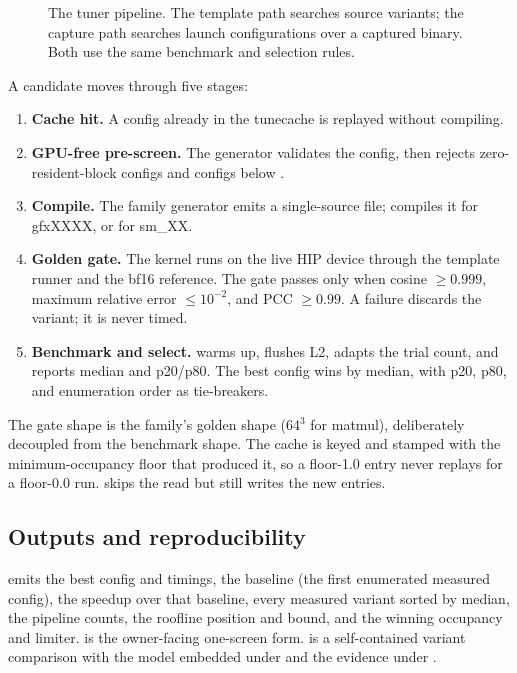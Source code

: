 \begin{figure}[htbp]
\centering
\resizebox{\textwidth}{!}{}
\caption{The tuner pipeline. The template path searches source variants;
the capture path searches launch configurations over a captured binary. Both
use the same benchmark and selection rules.}
\label{fig:tuner}
\end{figure}

A candidate moves through five stages:
\begin{enumerate}
  \item \textbf{Cache hit.} A config already in the tunecache is replayed
        without compiling.
  \item \textbf{GPU-free pre-screen.} The generator validates the config, then
         rejects zero-resident-block configs and configs
        below .
  \item \textbf{Compile.} The family generator emits a single-source
         file;  compiles it for gfxXXXX, or
         for sm\_XX.
  \item \textbf{Golden gate.} The kernel runs on the live HIP device through
        the template runner and the bf16 reference. The gate passes only when
        cosine $\ge 0.999$, maximum relative error $\le 10^{-2}$, and PCC
        $\ge 0.99$. A failure discards the variant; it is never timed.
  \item \textbf{Benchmark and select.}  warms up, flushes
        L2, adapts the trial count, and reports median and p20/p80. The best
        config wins by median, with p20, p80, and enumeration order as
        tie-breakers.
\end{enumerate}

The gate shape is the family's golden shape (64$^3$ for matmul), deliberately
decoupled from the benchmark shape. The cache is keyed
 and stamped with the minimum-occupancy floor
that produced it, so a floor-1.0 entry never replays for a floor-0.0 run.
 skips the read but still writes the new entries.

\subsection{Outputs and reproducibility}
\label{sec:c2-output}

 emits the best config and timings, the baseline (the first
enumerated measured config), the speedup over that baseline, every measured
variant sorted by median, the pipeline counts, the roofline position and bound,
and the winning occupancy and limiter.  is the owner-facing
one-screen form.  is a self-contained variant comparison with the
model embedded under  and the evidence under
.

